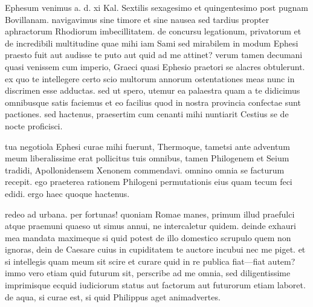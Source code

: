 


 Ephesum venimus a. d. xi Kal. Sextilis sexagesimo et quingentesimo post pugnam Bovillanam. navigavimus sine timore et sine nausea sed tardius propter aphractorum Rhodiorum imbecillitatem. de concursu legationum, privatorum et de incredibili multitudine quae mihi iam Sami sed mirabilem in modum Ephesi praesto fuit aut audisse te puto aut quid ad me attinet? verum tamen decumani quasi venissem cum imperio, Graeci quasi Ephesio praetori se alacres obtulerunt. ex quo te intellegere certo scio multorum annorum ostentationes meas nunc in discrimen esse adductas. sed ut spero, utemur ea palaestra quam a te didicimus omnibusque satis faciemus et eo facilius quod in nostra provincia confectae sunt pactiones. sed hactenus, praesertim cum cenanti mihi nuntiarit Cestius se de nocte proficisci.

 tua negotiola Ephesi curae mihi fuerunt, Thermoque, tametsi ante adventum meum liberalissime erat pollicitus tuis omnibus, tamen Philogenem et Seium tradidi, Apollonidensem Xenonem commendavi. omnino omnia se facturum recepit. ego praeterea rationem Philogeni permutationis eius quam tecum feci edidi. ergo haec quoque hactenus.

 redeo ad urbana. per fortunas! quoniam Romae manes, primum illud praefulci atque praemuni quaeso ut simus annui, ne intercaletur quidem. deinde exhauri mea mandata maximeque si quid potest de illo domestico scrupulo quem non ignoras, dein de Caesare cuius in cupiditatem te auctore incubui nec me piget. et si intellegis quam meum sit scire et curare quid in re publica fiat—fiat autem? immo vero etiam quid futurum sit, perscribe ad me omnia, sed diligentissime imprimisque ecquid iudiciorum status aut factorum aut futurorum etiam laboret. de aqua, si curae est, si quid Philippus aget animadvertes.
